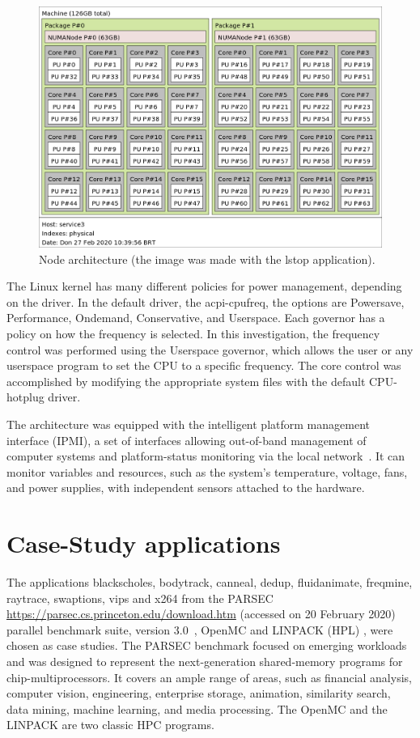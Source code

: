 \begin{figure}[H]
\centering
\includegraphics[width=\columnwidth]{models/figures/architecture.png}
\caption{Node architecture (the image was made with the lstop application).}
\label{fig:architecture}
\end{figure}

The Linux kernel has many different policies for power management, depending on the driver. In the default driver, the acpi-cpufreq, the options are Powersave, Performance, Ondemand, Conservative, and Userspace. Each governor has a policy on how the frequency is selected. In this investigation, the frequency control was performed using the Userspace governor, which allows the user or any userspace program to set the CPU to a specific frequency. The core control was accomplished by modifying the appropriate system files with the default CPU-hotplug driver.

The architecture was equipped with the intelligent platform management interface (IPMI), a set of interfaces allowing out-of-band management of computer systems and platform-status monitoring via the local network~\cite{Schwenkler2006IntelligentInterface}. It can monitor variables and resources, such as the system's temperature, voltage, fans, and power supplies, with independent sensors attached to the hardware.

\section{Case-Study applications} \label{sec:casestudyapplication}
The applications blackscholes, bodytrack, canneal, dedup, fluidanimate, freqmine, raytrace, swaptions, vips and x264 from the PARSEC \url{https://parsec.cs.princeton.edu/download.htm} (accessed on 20 February  2020) parallel benchmark suite, version 3.0~\cite{Bienia2008TheSuite}, OpenMC \cite{Romano2015OpenMC:Development} and LINPACK (HPL) \cite{Dongarra1988TheExplanation}, were chosen as case studies. The PARSEC benchmark focused on emerging workloads and was designed to represent the next-generation shared-memory programs for chip-multiprocessors. It covers an ample range of areas, such as financial analysis, computer vision, engineering, enterprise storage, animation, similarity search, data mining, machine learning, and media processing. The OpenMC and the LINPACK are two classic HPC programs.

